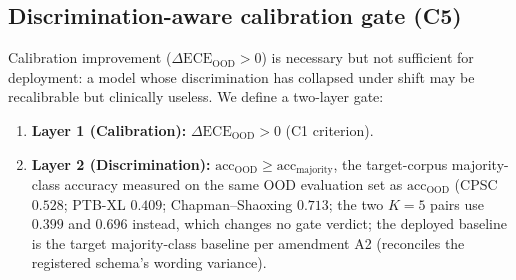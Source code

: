 \documentclass[review,12pt,nonatbib]{elsarticle}
\begin{document}
\subsection{Discrimination-aware calibration gate (C5)}
\label{sec:gate}
Calibration improvement ($\Delta\text{ECE}_{\text{OOD}} > 0$) is
necessary but not sufficient for deployment: a model whose
discrimination has collapsed under shift may be recalibrable but
clinically useless. We define a two-layer gate:
\begin{enumerate}
    \item \textbf{Layer 1 (Calibration):} $\Delta\text{ECE}_{\text{OOD}} > 0$
    (C1 criterion).
    \item \textbf{Layer 2 (Discrimination):} $\text{acc}_{\text{OOD}} \geq
    \text{acc}_{\text{majority}}$, the target-corpus majority-class
    accuracy measured on the same OOD evaluation set as
    $\text{acc}_{\text{OOD}}$ (CPSC $0.528$; PTB-XL $0.409$;
    Chapman--Shaoxing $0.713$; the two $K{=}5$ pairs use $0.399$ and
    $0.696$ instead, which changes no gate verdict; the deployed
    baseline is the target majority-class baseline per amendment A2
    (reconciles the registered schema's wording variance).
\end{enumerate}
\end{document}
